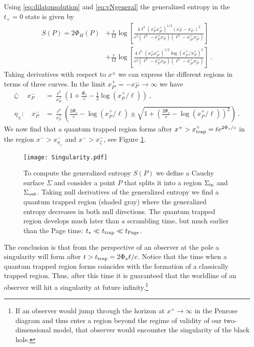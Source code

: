 \documentclass[a4paper,11pt]{article}
\newcommand{\beq}{\begin{equation}}
\newcommand{\eeq}{\end{equation}}
\newcommand{\bal}{\begin{aligned}}
\newcommand{\eal}{\end{aligned}}
\numberwithin{equation}{section}
\begin{document}
Using \eqref{eq:dilatonsolution} and \eqref{eq:vNgeneral} the generalized entropy in the $t_+=0$ state is given by
\beq
\bal
S(P) = 2\Phi_H(P) &+ \frac c{12}\log\left[\frac{4\ell^3(x^+_{P}x^+_{P'})^{1/2}(x_{P}^--x_{P'}^-)^2}{\epsilon^2(\ell^2-x_P^+x_P^-)(\ell^2-x_{P'}^+x_{P'}^-)}\right] \\
&+\frac c{12}\log\left[\frac{4\ell^5(x^+_{P}x^+_{P'})^{1/2}\log(x_{P'}^+/x_P^+)^2}{\epsilon^2(\ell^2-x_P^+x_P^-)(\ell^2-x_{P'}^+x_{P'}^-)}\right] ~.
\eal
\eeq
Taking derivatives with respect to $x^\pm$ we can express the different regions in terms of three curves. In the limit $x_{P'}^+ = -x_{P'}^-\to\infty$ we have
\beq
\bal
\zeta: \quad x^-_P&=\frac{\ell^2}{x^+_P}\left(1+\frac{\Phi_s}{c} -\frac12\log(x^+_P/\ell)\right)~,\\
\eta_\pm: \quad x^-_P&=\frac{\ell^2}{x^+_P}\left(\frac{2\Phi_s}{c}-\log(x_P^+/\ell) \pm \sqrt{1+\left(\frac{2\Phi_s}{c}-\log(x_P^+/\ell)\right)^2}\right) ~.
\eal
\eeq
We now find that a quantum trapped region forms after $x^+>x^+_{\rm trap}=\ell e^{2\Phi_s/c}$ in the region $x^->x^-_{\eta_+}$ and $x^->x^-_{\zeta}$, see Figure \ref{fig:GenEnt}.
%
\begin{figure}[ht]
\centering
\texttt{[image: Singularity.pdf]}
\caption{To compute the generalized entropy $S(P)$ we define a Cauchy surface $\Sigma$ and consider a point $P$ that splits it into a region $\Sigma_{\rm in}$ and $\Sigma_{\rm out}$. Taking null derivatives of the generalized entropy we find a quantum trapped region (shaded gray) where the generalized entropy decreases in both null directions. The quantum trapped region develops much later than a scrambling time, but much earlier than the Page time: $t_{*}\ll t_{\rm trap}\ll t_{\rm Page}$.}
\label{fig:GenEnt}
\end{figure}
%
The conclusion is that from the perspective of an observer at the pole a singularity will form after $t>t_{\rm trap}=2\Phi_s\ell/c$. Notice that the time when a quantum trapped region forms coincides with the formation of a classically trapped region. Thus, after this time it is guaranteed that the worldline of an observer will hit a singularity at future infinity.\footnote{If an observer would jump through the horizon at $x^+\to\infty$ in the Penrose diagram and thus enter a region beyond the regime of validity of our two-dimensional model, that observer would encounter the singularity of the black hole.} 
\end{document}
